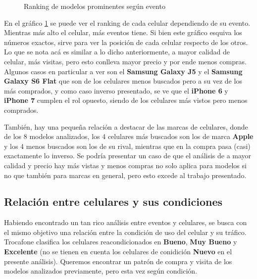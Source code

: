 \documentclass[a4paper]{article}
\begin{document}
\begin{figure}[!h]
	\caption{Ranking de modelos prominentes según evento}
	\label{fig:prominentesrank}
\end{figure}

En el gráfico \ref{fig:prominentesrank} se puede ver el ranking de cada celular dependiendo de su evento. Mientras más alto el celular, más eventos tiene. Si bien este gráfico esquiva los números exactos, sirve para ver la posición de cada celular respecto de los otros. Lo que se nota acá es similar a lo dicho anteriormente, a mayor calidad de celular, más visitas, pero esto conlleva mayor precio y por ende menos compras. Algunos casos en particular a ver son el \textbf{Samsung Galaxy J5} y el \textbf{Samsung Galaxy S6 Flat} que son de los celulares menos buscados pero a su vez de los más comprados, y como caso inverso presentado, se ve que el \textbf{iPhone 6} y \textbf{iPhone 7} cumplen el rol opuesto, siendo de los celulares más vistos pero menos comprados.

También, hay una pequeña relación a destacar de las marcas de celulares, donde de los 8 modelos analizados, los 4 celulares más buscados son los de marca \textbf{Apple} y los 4 menos buscados son los de su rival, mientras que en la compra pasa (casi) exactamente lo inverso. Se podría presentar un caso de que el análisis de a mayor calidad y precio hay más vistas y menos compras no solo aplica para modelos si no que también para marcas en general, pero esto excede al trabajo presentado.

\subsection{Relación entre celulares y sus condiciones}

Habiendo encontrado un tan rico análisis entre eventos y celulares, se busca con el mismo objetivo una relación entre la condición de uso del celular y su tráfico. Trocafone clasifica los celulares reacondicionados en \textbf{Bueno}, \textbf{Muy Bueno} y \textbf{Excelente} (no se tienen en cuenta los celulares de conidición \textbf{Nuevo} en el presente análisis). Queremos encontrar un patrón de compra y visita de los modelos analizados previamente, pero esta vez según condición.
\end{document}
